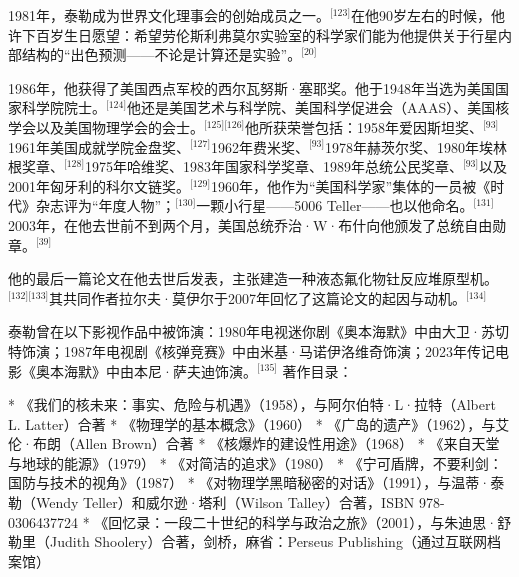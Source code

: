 1981年，泰勒成为世界文化理事会的创始成员之一。\(^\text{[123]}\)在他90岁左右的时候，他许下百岁生日愿望：希望劳伦斯利弗莫尔实验室的科学家们能为他提供关于行星内部结构的“出色预测——不论是计算还是实验”。\(^\text{[20]}\)

1986年，他获得了美国西点军校的西尔瓦努斯·塞耶奖。他于1948年当选为美国国家科学院院士。\(^\text{[124]}\)他还是美国艺术与科学院、美国科学促进会（AAAS）、美国核学会以及美国物理学会的会士。\(^\text{[125][126]}\)他所获荣誉包括：1958年爱因斯坦奖、\(^\text{[93]}\)1961年美国成就学院金盘奖、\(^\text{[127]}\)1962年费米奖、\(^\text{[93]}\)1978年赫茨尔奖、1980年埃林根奖章、\(^\text{[128]}\)1975年哈维奖、1983年国家科学奖章、1989年总统公民奖章、\(^\text{[93]}\)以及2001年匈牙利的科尔文链奖。\(^\text{[129]}\)1960年，他作为“美国科学家”集体的一员被《时代》杂志评为“年度人物”；\(^\text{[130]}\)一颗小行星——5006 Teller——也以他命名。\(^\text{[131]}\)2003年，在他去世前不到两个月，美国总统乔治·W·布什向他颁发了总统自由勋章。\(^\text{[39]}\)

他的最后一篇论文在他去世后发表，主张建造一种液态氟化物钍反应堆原型机。\(^\text{[132][133]}\)其共同作者拉尔夫·莫伊尔于2007年回忆了这篇论文的起因与动机。\(^\text{[134]}\)

泰勒曾在以下影视作品中被饰演：1980年电视迷你剧《奥本海默》中由大卫·苏切特饰演；1987年电视剧《核弹竞赛》中由米基·马诺伊洛维奇饰演；2023年传记电影《奥本海默》中由本尼·萨夫迪饰演。\(^\text{[135]}\)
著作目录：

* 《我们的核未来：事实、危险与机遇》（1958），与阿尔伯特·L·拉特（Albert L. Latter）合著
* 《物理学的基本概念》（1960）
* 《广岛的遗产》（1962），与艾伦·布朗（Allen Brown）合著
* 《核爆炸的建设性用途》（1968）
* 《来自天堂与地球的能源》（1979）
* 《对简洁的追求》（1980）
* 《宁可盾牌，不要利剑：国防与技术的视角》（1987）
* 《对物理学黑暗秘密的对话》（1991），与温蒂·泰勒（Wendy Teller）和威尔逊·塔利（Wilson Talley）合著，ISBN 978-0306437724
* 《回忆录：一段二十世纪的科学与政治之旅》（2001），与朱迪思·舒勒里（Judith Shoolery）合著，剑桥，麻省：Perseus Publishing（通过互联网档案馆）
